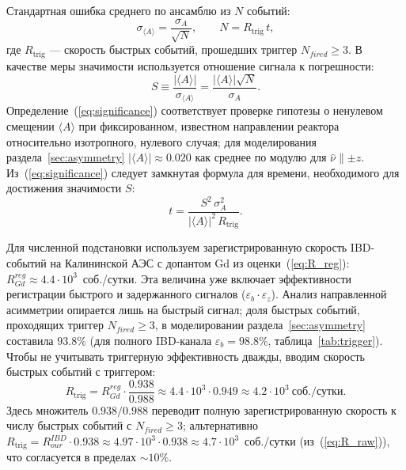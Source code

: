 \documentclass[a4paper,12pt]{extarticle}
\begin{document}
Стандартная ошибка среднего по ансамблю из $N$ событий:
\begin{equation}
    \sigma_{\langle A\rangle}=\frac{\sigma_A}{\sqrt{N}},\qquad N=R_{\mathrm{trig}}\,t,
    \label{eq:sigma_A_mean}
\end{equation}
где $R_{\mathrm{trig}}$ --- скорость быстрых событий, прошедших триггер $N_{fired}\ge 3$. В качестве меры значимости используется отношение сигнала к погрешности:
\begin{equation}
    S\equiv\frac{|\langle A\rangle|}{\sigma_{\langle A\rangle}}
    =\frac{|\langle A\rangle|\sqrt{N}}{\sigma_A}.
    \label{eq:significance}
\end{equation}
Определение~(\ref{eq:significance}) соответствует проверке гипотезы о ненулевом смещении $\langle A\rangle$ при фиксированном, известном направлении реактора относительно изотропного, нулевого случая; для моделирования раздела~\ref{sec:asymmetry} $|\langle A\rangle|\approx 0.020$ как среднее по модулю для $\hat{\nu}\parallel\pm z$. Из~(\ref{eq:significance}) следует замкнутая формула для времени, необходимого для достижения значимости $S$:
\begin{equation}
    t=\frac{S^2\,\sigma_A^2}{|\langle A\rangle|^2\,R_{\mathrm{trig}}}.
    \label{eq:t_sig}
\end{equation}

Для численной подстановки используем зарегистрированную скорость IBD-событий на Калининской АЭС с допантом Gd из оценки~(\ref{eq:R_reg}): $R^{reg}_{Gd}\approx 4.4\cdot 10^{3}$~соб./сутки. Эта величина уже включает эффективности регистрации быстрого и задержанного сигналов ($\varepsilon_{b}\cdot\varepsilon_{z}$). Анализ направленной асимметрии опирается лишь на быстрый сигнал; доля быстрых событий, проходящих триггер $N_{fired}\ge 3$, в моделировании раздела~\ref{sec:asymmetry} составила $93.8\%$ (для полного IBD-канала $\varepsilon_{b}=98.8\%$, таблица~\ref{tab:trigger}). Чтобы не учитывать триггерную эффективность дважды, вводим скорость быстрых событий с триггером:
\begin{equation}
    R_{\mathrm{trig}}=R^{reg}_{Gd}\cdot\frac{0.938}{0.988}\approx 4.4\cdot 10^{3}\cdot 0.949\approx 4.2\cdot 10^{3}~\text{соб./сутки}.
    \label{eq:R_trig}
\end{equation}
Здесь множитель $0.938/0.988$ переводит полную зарегистрированную скорость к числу быстрых событий с $N_{fired}\ge 3$; альтернативно $R_{\mathrm{trig}}=R^{IBD}_{our}\cdot 0.938\approx 4.97\cdot 10^{3}\cdot 0.938\approx 4.7\cdot 10^{3}$~соб./сутки (из~(\ref{eq:R_raw})), что согласуется в пределах $\sim 10\%$.
\end{document}
